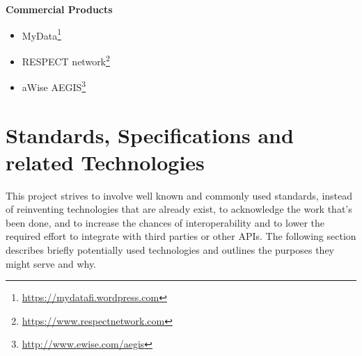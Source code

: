 \documentclass[12pt,english,a4paper,titlepage,cleardoublepage=empty,dottedtoc]{report}
\renewcommand{\href}[2]{#2\footnote{\url{#1}}}
\providecommand{\tightlist}{%
  \setlength{\itemsep}{0pt}\setlength{\parskip}{0pt}}
\begin{document}
\textbf{Commercial Products}

\begin{itemize}
\tightlist
\item
  \href{https://mydatafi.wordpress.com}{MyData}
\item
  \href{https://www.respectnetwork.com}{RESPECT network}
\item
  \href{http://www.ewise.com/aegis}{aWise AEGIS}
\end{itemize}

\hypertarget{standards-specifications-and-related-technologies}{\section{Standards,
Specifications and related
Technologies}\label{standards-specifications-and-related-technologies}}

This project strives to involve well known and commonly used standards,
instead of reinventing technologies that are already exist, to
acknowledge the work that's been done, and to increase the chances of
interoperability and to lower the required effort to integrate with
third parties or other APIs. The following section describes briefly
potentially used technologies and outlines the purposes they might serve
and why.
\end{document}
